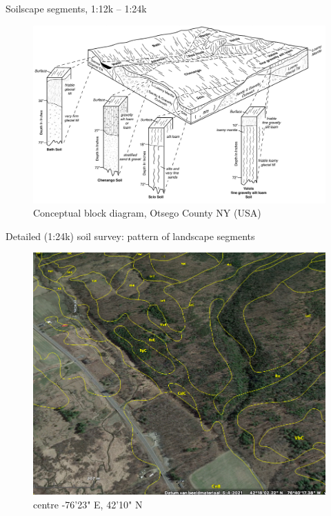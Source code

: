 \documentclass[aspectratio=169]{beamer}
\begin{document}
\begin{frame}{Soilscape segments, 1:12k -- 1:24k}
    \begin{figure}
        \centering
\includegraphics[height=0.65\textheight]{./graphics_david/NY-2010-09-28-14.pdf}\\
{Conceptual block diagram, Otsego County NY (USA)}
     \end{figure}
\end{frame}

\begin{frame}{Detailed (1:24k) soil survey: pattern of landscape segments}
    \begin{figure}
        \centering
\includegraphics[height=0.7\textheight]{./graphics_david/PonyHollow_SoilWeb_Screenshot_relief.png}\\
{\footnotesize centre -76'23" E, 42'10" N}
     \end{figure}
    \end{frame}
\end{document}
